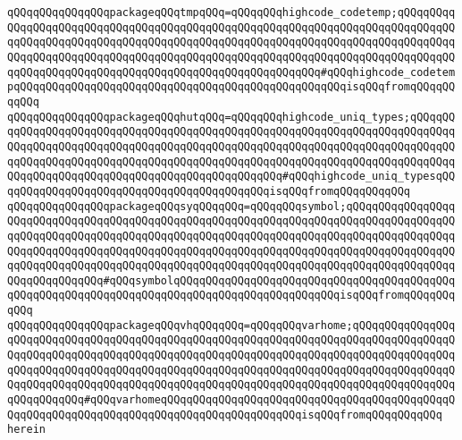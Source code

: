 \verb|qQQqqQQqqQQqqQQqpackageqQQqtmpqQQq=qQQqqQQqhighcode_codetemp;qQQqqQQqqQQqqQQqqQQqqQQqqQQqqQQqqQQqqQQqqQQqqQQqqQQqqQQqqQQqqQQqqQQqqQQqqQQqqQQqqQQqqQQqqQQqqQQqqQQqqQQqqQQqqQQqqQQqqQQqqQQqqQQqqQQqqQQqqQQqqQQqqQQqqQQqqQQqqQQqqQQqqQQqqQQqqQQqqQQqqQQqqQQqqQQqqQQqqQQqqQQqqQQqqQQqqQQqqQQqqQQqqQQqqQQqqQQqqQQqqQQqqQQqqQQqqQQqqQQqqQQqqQQq#qQQqhighcode_codetempqQQqqQQqqQQqqQQqqQQqqQQqqQQqqQQqqQQqqQQqqQQqqQQqqQQqisqQQqfromqQQqqQQqqQQq|\newline
\verb|qQQqqQQqqQQqqQQqpackageqQQqhutqQQq=qQQqqQQqhighcode_uniq_types;qQQqqQQqqQQqqQQqqQQqqQQqqQQqqQQqqQQqqQQqqQQqqQQqqQQqqQQqqQQqqQQqqQQqqQQqqQQqqQQqqQQqqQQqqQQqqQQqqQQqqQQqqQQqqQQqqQQqqQQqqQQqqQQqqQQqqQQqqQQqqQQqqQQqqQQqqQQqqQQqqQQqqQQqqQQqqQQqqQQqqQQqqQQqqQQqqQQqqQQqqQQqqQQqqQQqqQQqqQQqqQQqqQQqqQQqqQQqqQQqqQQqqQQqqQQqqQQqqQQq#qQQqhighcode_uniq_typesqQQqqQQqqQQqqQQqqQQqqQQqqQQqqQQqqQQqqQQqqQQqisqQQqfromqQQqqQQqqQQq|\newline
\verb|qQQqqQQqqQQqqQQqpackageqQQqsyqQQqqQQq=qQQqqQQqsymbol;qQQqqQQqqQQqqQQqqQQqqQQqqQQqqQQqqQQqqQQqqQQqqQQqqQQqqQQqqQQqqQQqqQQqqQQqqQQqqQQqqQQqqQQqqQQqqQQqqQQqqQQqqQQqqQQqqQQqqQQqqQQqqQQqqQQqqQQqqQQqqQQqqQQqqQQqqQQqqQQqqQQqqQQqqQQqqQQqqQQqqQQqqQQqqQQqqQQqqQQqqQQqqQQqqQQqqQQqqQQqqQQqqQQqqQQqqQQqqQQqqQQqqQQqqQQqqQQqqQQqqQQqqQQqqQQqqQQqqQQqqQQqqQQqqQQqqQQqqQQqqQQqqQQqqQQq#qQQqsymbolqQQqqQQqqQQqqQQqqQQqqQQqqQQqqQQqqQQqqQQqqQQqqQQqqQQqqQQqqQQqqQQqqQQqqQQqqQQqqQQqqQQqqQQqqQQqqQQqisqQQqfromqQQqqQQqqQQq|\newline
\verb|qQQqqQQqqQQqqQQqpackageqQQqvhqQQqqQQq=qQQqqQQqvarhome;qQQqqQQqqQQqqQQqqQQqqQQqqQQqqQQqqQQqqQQqqQQqqQQqqQQqqQQqqQQqqQQqqQQqqQQqqQQqqQQqqQQqqQQqqQQqqQQqqQQqqQQqqQQqqQQqqQQqqQQqqQQqqQQqqQQqqQQqqQQqqQQqqQQqqQQqqQQqqQQqqQQqqQQqqQQqqQQqqQQqqQQqqQQqqQQqqQQqqQQqqQQqqQQqqQQqqQQqqQQqqQQqqQQqqQQqqQQqqQQqqQQqqQQqqQQqqQQqqQQqqQQqqQQqqQQqqQQqqQQqqQQqqQQqqQQqqQQqqQQqqQQqqQQq#qQQqvarhomeqQQqqQQqqQQqqQQqqQQqqQQqqQQqqQQqqQQqqQQqqQQqqQQqqQQqqQQqqQQqqQQqqQQqqQQqqQQqqQQqqQQqqQQqqQQqisqQQqfromqQQqqQQqqQQq|\newline
\verb|herein|\newline

